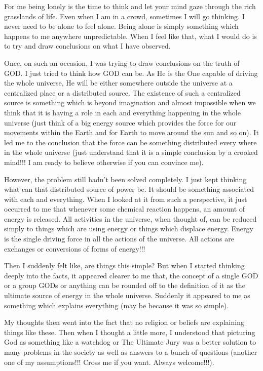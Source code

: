 \vskip 2pt
{\engtext
For me being lonely is the time to think and let your mind gaze through the rich grasslands of life. Even when I am in a crowd, sometimes I will go thinking. I never need to be alone to feel alone. Being alone is simply something which happens to me anywhere unpredictable. When I feel like that, what I would do is to try and draw conclusions on what I have observed.

Once, on such an occasion, I was trying to draw conclusions on the truth of GOD. I just tried to think how GOD can be. As He is the One capable of driving the whole universe, He will be either somewhere outside the universe at a centralized place or a distributed source. The existence of such a centralized source is something which is beyond imagination and almost impossible when we think that it is having a role in each and everything happening in the whole universe (just think of a big energy source which provides the force for our movements within the Earth and for Earth to move around the sun and so on). It led me to the conclusion that the force can be something distributed every where in the whole universe (just understand that it is a simple conclusion by a crooked mind!!! I am ready to believe otherwise if you can convince me).

However, the problem still hadn't been solved completely. I just kept thinking what can that distributed source of power be. It should be something associated with each and everything. When I looked at it from such a perspective, it just occurred to me that whenever some chemical reaction happens, an amount of energy is released. All activities in the universe, when thought of, can be reduced simply to things which are using energy or things which displace energy. Energy is the single driving force in all the actions of the universe. All actions are exchanges or conversions of forms of energy!!!

Then I suddenly felt like, are things this simple? But when I started thinking deeply into the facts, it appeared clearer to me that, the concept of a single GOD or a group GODs or anything can be rounded off to the definition of it as the ultimate source of energy in the whole universe. Suddenly it appeared to me as something which explains everything (may be because it was so simple).

My thoughts then went into the fact that no religion or beliefs are explaining things like these. Then when I thought a little more, I understood that picturing God as something like a watchdog or The Ultimate Jury was a better solution to many problems in the society as well as answers to a bunch of questions (another one of my assumptions!!! Cross me if you want. Always welcome!!!).

}
